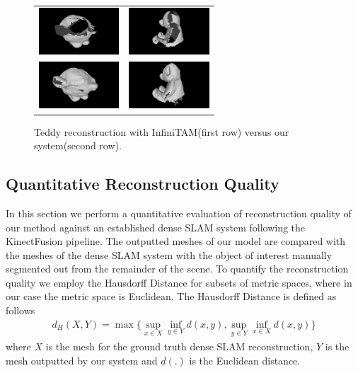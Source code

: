 \begin{figure}[!t]
	\centering
	\begin{tabular}{cc}
		\includegraphics[width=3cm]{screenshots/GappyTeddy/one_scene00.png}&
		\includegraphics[width=3cm]{screenshots/GappyTeddy/one_scene01.png}\\
		\includegraphics[width=3cm]{screenshots/GappyTeddy/multi_scene00.png}&
		\includegraphics[width=3cm]{screenshots/GappyTeddy/multi_scene01.png}\\
	\end{tabular}
	\vspace{-3mm}
	\caption{
		Teddy reconstruction with InfiniTAM(first row) versus our system(second row).
	}
	\label{fig:gappy_teddy}
\end{figure}

\subsection{Quantitative Reconstruction Quality}
In this section we perform a quantitative evaluation of reconstruction quality of our method against an established dense SLAM system \cite{Prisacariu2014} following the KinectFusion \cite{Newcombe2011} pipeline.
The outputted meshes of our model are compared with the meshes of the dense SLAM system with the object of interest manually segmented out from the remainder of the scene. To quantify the reconstruction quality 
we employ the Hausdorff Distance for subsets of metric spaces, where in our case the metric space is Euclidean. The Hausdorff Distance is defined as follows
\begin{equation}
\begin{split}
d_{H}(X, Y) = \max \Bigg \{ \sup_{x \in X} \inf_{y \in Y} d(x, y), \sup_{y \in Y} \inf_{x \in X} d(x, y) \Bigg \}
\end{split}
\end{equation}
where $X$ is the mesh for the ground truth dense SLAM reconstruction, $Y$ is the mesh outputted by our system and $d(.)$ is the Euclidean distance.

